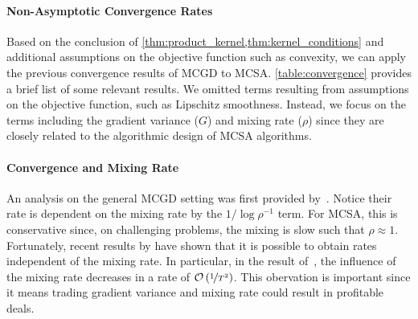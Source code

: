 \vspace{-0.05in}
\paragraph{Non-Asymptotic Convergence Rates}
Based on the conclusion of \cref{thm:product_kernel,thm:kernel_conditions} and additional assumptions on the objective function such as convexity, we can apply the previous convergence results of MCGD to MCSA.
\cref{table:convergence} provides a brief list of some relevant results.
We omitted terms resulting from assumptions on the objective function, such as Lipschitz smoothness.
Instead, we focus on the terms including the gradient variance (\(G\)) and mixing rate (\(\rho\)) since they are closely related to the algorithmic design of MCSA algorithms.

\vspace{-0.05in}
\paragraph{Convergence and Mixing Rate}
An analysis on the general MCGD setting was first provided by~\citet{duchi_ergodic_2012}.
Notice their rate is dependent on the mixing rate by the \(1 / \log \rho^{-1}\) term.
For MCSA, this is conservative since, on challenging problems, the mixing is slow such that \(\rho \approx 1\).
Fortunately, recent results by \citet{doan_convergence_2020,doan_finitetime_2020} have shown that it is possible to obtain rates independent of the mixing rate.
In particular, in the result of~\citet{doan_finitetime_2020}, the influence of the mixing rate decreases in a rate of \(\mathcal{O}\left(\nicefrac{1}{T^2}\right)\).
This obervation is important since it means trading gradient variance and mixing rate could result in profitable deals.

